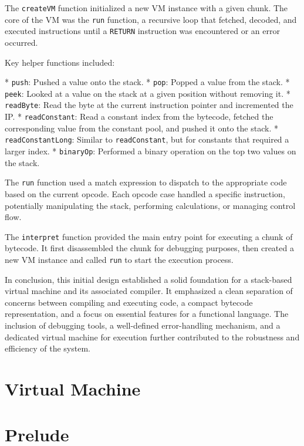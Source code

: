 The \texttt{createVM} function initialized a new VM instance with a given chunk. The core of the VM was the \texttt{run} function, a recursive loop that fetched, decoded, and executed instructions until a \texttt{RETURN} instruction was encountered or an error occurred.

Key helper functions included:

*   \texttt{push}: Pushed a value onto the stack.
*   \texttt{pop}: Popped a value from the stack.
*   \texttt{peek}: Looked at a value on the stack at a given position without removing it.
*   \texttt{readByte}: Read the byte at the current instruction pointer and incremented the IP.
*   \texttt{readConstant}: Read a constant index from the bytecode, fetched the corresponding value from the constant pool, and pushed it onto the stack.
*   \texttt{readConstantLong}: Similar to \texttt{readConstant}, but for constants that required a larger index.
*   \texttt{binaryOp}: Performed a binary operation on the top two values on the stack.

The \texttt{run} function used a match expression to dispatch to the appropriate code based on the current opcode. Each opcode case handled a specific instruction, potentially manipulating the stack, performing calculations, or managing control flow.

The \texttt{interpret} function provided the main entry point for executing a chunk of bytecode. It first disassembled the chunk for debugging purposes, then created a new VM instance and called \texttt{run} to start the execution process.

In conclusion, this initial design established a solid foundation for a stack-based virtual machine and its associated compiler. It emphasized a clean separation of concerns between compiling and executing code, a compact bytecode representation, and a focus on essential features for a functional language. The inclusion of debugging tools, a well-defined error-handling mechanism, and a dedicated virtual machine for execution further contributed to the robustness and efficiency of the system.

\section{Virtual Machine}\label{sec:virtual-machine}

\section{Prelude}\label{sec:prelude}

